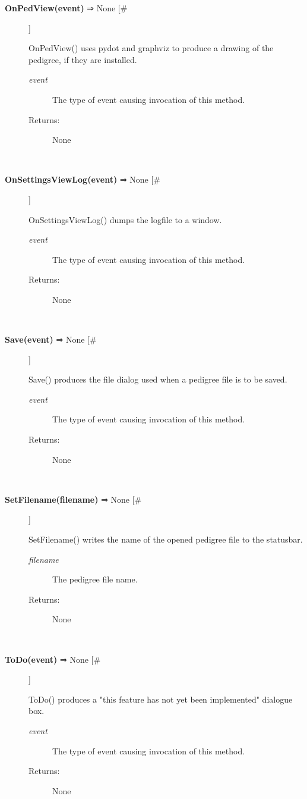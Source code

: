 \documentclass{article}
\begin{document}
\begin{description}
\item[\textbf{OnPedView(event)} ⇒ None [\#]
]
\par OnPedView() uses pydot and graphviz to produce a drawing of the pedigree,
if they are installed.
\begin{description}
\item[\textit{event}
]
The type of event causing invocation of this method.
\item[Returns:
]
None
\end{description}\\

\item[\textbf{OnSettingsViewLog(event)} ⇒ None [\#]
]
\par OnSettingsViewLog() dumps the logfile to a window.
\begin{description}
\item[\textit{event}
]
The type of event causing invocation of this method.
\item[Returns:
]
None
\end{description}\\

\item[\textbf{Save(event)} ⇒ None [\#]
]
\par Save() produces the file dialog used when a pedigree file is to be saved.
\begin{description}
\item[\textit{event}
]
The type of event causing invocation of this method.
\item[Returns:
]
None
\end{description}\\

\item[\textbf{SetFilename(filename)} ⇒ None [\#]
]
\par SetFilename() writes the name of the opened pedigree file to the statusbar.
\begin{description}
\item[\textit{filename}
]
The pedigree file name.
\item[Returns:
]
None
\end{description}\\

\item[\textbf{ToDo(event)} ⇒ None [\#]
]
\par ToDo() produces a "this feature has not yet been implemented" dialogue box.
\begin{description}
\item[\textit{event}
]
The type of event causing invocation of this method.
\item[Returns:
]
None
\end{description}\\

\end{description}
\end{document}

